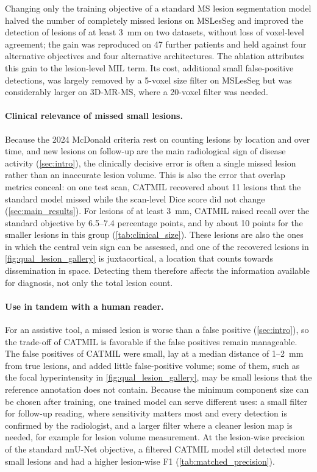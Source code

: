 Changing only the training objective of a standard MS lesion segmentation
model halved the number of completely missed lesions on MSLesSeg and
improved the detection of lesions of at least 3~mm on two datasets, without
loss of voxel-level agreement; the gain was reproduced on 47 further
patients and held against four alternative objectives and four alternative
architectures. The ablation attributes this gain to the lesion-level MIL
term. Its cost, additional small false-positive detections, was largely
removed by a 5-voxel size filter on MSLesSeg but was considerably larger on
3D-MR-MS, where a 20-voxel filter was needed.

\paragraph{Clinical relevance of missed small lesions.}
Because the 2024 McDonald criteria rest on counting lesions by location and
over time, and new lesions on follow-up are the main radiological sign of
disease activity (\cref{sec:intro}), the clinically decisive error is often
a single missed lesion rather than an inaccurate lesion volume. This is
also the error that overlap metrics conceal: on one test scan, CATMIL
recovered about 11 lesions that the standard model missed while the
scan-level Dice score did not change (\cref{sec:main_results}). For lesions of at least
3~mm, CATMIL raised recall over the standard objective by 6.5--7.4
percentage points, and by about 10 points for the smaller lesions in this
group (\cref{tab:clinical_size}). These lesions are also the ones in which
the central vein sign can be assessed, and one of the recovered lesions in
\cref{fig:qual_lesion_gallery} is juxtacortical, a location that counts
towards dissemination in space. Detecting them therefore affects the
information available for diagnosis, not only the total lesion count.

\paragraph{Use in tandem with a human reader.}
For an assistive tool, a missed lesion is worse than a false positive
(\cref{sec:intro}), so the trade-off of CATMIL is favorable if the false
positives remain manageable. The false positives of CATMIL were small,
lay at a median distance of 1--2~mm from true lesions, and added little
false-positive volume; some of them, such as the focal hyperintensity in
\cref{fig:qual_lesion_gallery}, may be small lesions that the reference
annotation does not contain. Because the minimum component size can be
chosen after training, one trained model can serve different uses: a small
filter for follow-up reading, where sensitivity matters most and every
detection is confirmed by the radiologist, and a larger filter where a
cleaner lesion map is needed, for example for lesion volume measurement.
At the lesion-wise precision of the standard nnU-Net objective, a filtered
CATMIL model still detected more small lesions and had a higher lesion-wise
F1 (\cref{tab:matched_precision}).

